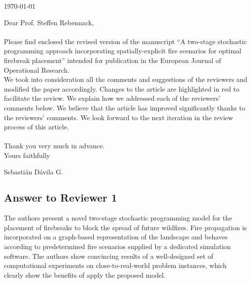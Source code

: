 \documentclass[12pt]{article}
\begin{document}
\begin{flushright}
\today
\end{flushright}


Dear Prof.  Steffen Rebennack,\\
\\


Please find enclosed the revised version of the manuscript ``A two-stage stochastic programming approach incorporating spatially-explicit fire scenarios for optimal firebreak placement'' intended for publication in the European Journal of Operational Research. \\

We took into consideration all the comments and suggestions of the reviewers and modified the paper accordingly. Changes to the article are highlighted in red to facilitate the review.  We explain how we addressed each of the reviewers' comments below.  We believe that the article has improved significantly thanks to the reviewers' comments.  We look forward to the next iteration in the review process of this article. \\
\\

Thank you very much in advance. \\ 

Yours faithfully
\\

\begin{flushright}
Sebasti\'an D\'avila G.
\end{flushright}



\newpage

\begin{center}
\section*{Answer to Reviewer 1}
\end{center}

The authors present a novel two-stage stochastic programming model for the placement of firebreaks to block the spread of future wildfires. Fire propagation is incorporated on a graph-based representation of the landscape and behaves according to predetermined fire scenarios supplied by a dedicated simulation software. The authors show convincing results of a well-designed set of computational experiments on close-to-real-world problem instances, which clearly show the benefits of apply the proposed model.\\
\end{document}
